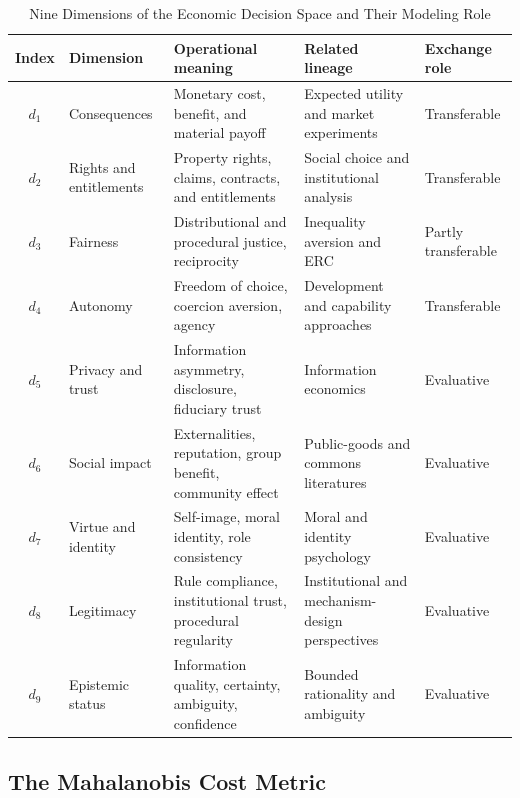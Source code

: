 \documentclass[journal]{IEEEtran}
\begin{document}
\begin{table}[!t]
\renewcommand{\arraystretch}{1.15}
\caption{Nine Dimensions of the Economic Decision Space and Their Modeling Role}
\label{tab:dimensions}
\centering
\begin{tabular}{c p{} p{} p{} p{}}
\toprule
\textbf{Index} & \textbf{Dimension} & \textbf{Operational meaning} & \textbf{Related lineage} & \textbf{Exchange role} \\
\midrule
$d_1$ & Consequences & Monetary cost, benefit, and material payoff & Expected utility and market experiments~\cite{vonneumann1944,smith1962} & Transferable \\
$d_2$ & Rights and entitlements & Property rights, claims, contracts, and entitlements & Social choice and institutional analysis~\cite{arrow1951,ostrom1990} & Transferable \\
$d_3$ & Fairness & Distributional and procedural justice, reciprocity & Inequality aversion and ERC~\cite{fehr1999,bolton2000} & Partly transferable \\
$d_4$ & Autonomy & Freedom of choice, coercion aversion, agency & Development and capability approaches~\cite{sen1999} & Transferable \\
$d_5$ & Privacy and trust & Information asymmetry, disclosure, fiduciary trust & Information economics~\cite{akerlof1970,stiglitz1981} & Evaluative \\
$d_6$ & Social impact & Externalities, reputation, group benefit, community effect & Public-goods and commons literatures~\cite{ostrom1990,camerer2003} & Evaluative \\
$d_7$ & Virtue and identity & Self-image, moral identity, role consistency & Moral and identity psychology~\cite{haidt2012,tetlock2000} & Evaluative \\
$d_8$ & Legitimacy & Rule compliance, institutional trust, procedural regularity & Institutional and mechanism-design perspectives~\cite{ostrom1990,thaler2008} & Evaluative \\
$d_9$ & Epistemic status & Information quality, certainty, ambiguity, confidence & Bounded rationality and ambiguity~\cite{simon1955,ellsberg1961} & Evaluative \\
\bottomrule
\end{tabular}
\end{table}

\subsection{The Mahalanobis Cost Metric}
\end{document}
